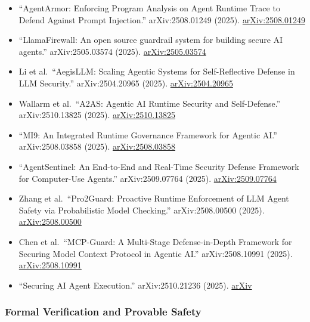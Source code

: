 \documentclass[
]{article}
\providecommand{\tightlist}{%
  \setlength{\itemsep}{0pt}\setlength{\parskip}{0pt}}
\begin{document}
\begin{itemize}
\tightlist
\item
  ``AgentArmor: Enforcing Program Analysis on Agent Runtime Trace to
  Defend Against Prompt Injection.'' arXiv:2508.01249 (2025).
  \href{https://arxiv.org/abs/2508.01249}{arXiv:2508.01249}
\item
  ``LlamaFirewall: An open source guardrail system for building secure
  AI agents.'' arXiv:2505.03574 (2025).
  \href{https://arxiv.org/abs/2505.03574}{arXiv:2505.03574}
\item
  Li et al.~``AegisLLM: Scaling Agentic Systems for Self-Reflective
  Defense in LLM Security.'' arXiv:2504.20965 (2025).
  \href{https://arxiv.org/abs/2504.20965}{arXiv:2504.20965}
\item
  Wallarm et al.~``A2AS: Agentic AI Runtime Security and Self-Defense.''
  arXiv:2510.13825 (2025).
  \href{https://arxiv.org/abs/2510.13825}{arXiv:2510.13825}
\item
  ``MI9: An Integrated Runtime Governance Framework for Agentic AI.''
  arXiv:2508.03858 (2025).
  \href{https://arxiv.org/abs/2508.03858}{arXiv:2508.03858}
\item
  ``AgentSentinel: An End-to-End and Real-Time Security Defense
  Framework for Computer-Use Agents.'' arXiv:2509.07764 (2025).
  \href{https://arxiv.org/abs/2509.07764}{arXiv:2509.07764}
\item
  Zhang et al.~``Pro2Guard: Proactive Runtime Enforcement of LLM Agent
  Safety via Probabilistic Model Checking.'' arXiv:2508.00500 (2025).
  \href{https://arxiv.org/abs/2508.00500}{arXiv:2508.00500}
\item
  Chen et al.~``MCP-Guard: A Multi-Stage Defense-in-Depth Framework for
  Securing Model Context Protocol in Agentic AI.'' arXiv:2508.10991
  (2025). \href{https://arxiv.org/abs/2508.10991}{arXiv:2508.10991}
\item
  ``Securing AI Agent Execution.'' arXiv:2510.21236 (2025).
  \href{https://arxiv.org/abs/2510.21236}{arXiv}
\end{itemize}

\subsubsection{Formal Verification and Provable
Safety}\label{formal-verification-and-provable-safety}
\end{document}
